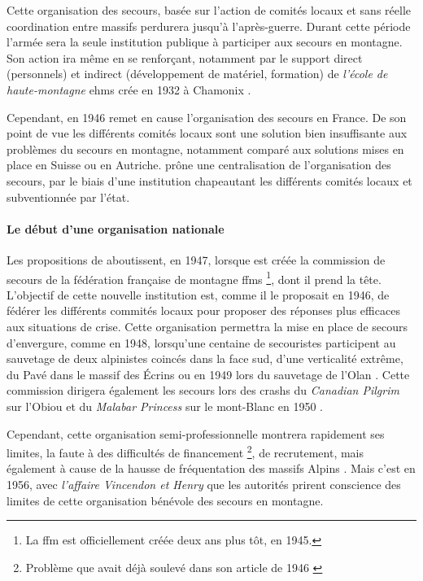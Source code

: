 Cette organisation des secours, basée sur l'action de comités locaux
et sans réelle coordination entre massifs perdurera jusqu'à
l'après-guerre. Durant cette période l'armée sera la seule institution
publique à participer aux secours en montagne. Son action ira même en
se renforçant, notamment par le support direct (personnels) et
indirect (développement de matériel, formation) de \emph{l'école de
  haute-montagne} \acp{ehm} crée en 1932 à Chamonix
\autocite{Mezin2016}.

Cependant, en 1946 \textcite{Devies1946} remet en cause l'organisation
des secours en France. De son point de vue les différents comités
locaux sont une solution bien insuffisante aux problèmes du secours
en montagne, notamment comparé aux solutions mises en place en Suisse
ou en Autriche.  prône une centralisation de
l'organisation des secours, par le biais d'une institution chapeautant
les différents comités locaux et subventionnée par l'état.

\paragraph{Le début d'une organisation nationale}

Les propositions de  aboutissent, en 1947, lorsque est
créée la commission de secours de la fédération française de montagne
\acp{ffm} \footnote{La \ac{ffm} est officiellement créée deux ans plus
  tôt, en 1945.}, dont il prend la tête. L'objectif de cette nouvelle
institution est, comme il le proposait en 1946, de fédérer les
différents commités locaux pour proposer des réponses plus efficaces
aux situations de crise. Cette organisation permettra la mise en place
de secours d'envergure, comme en 1948, lorsqu'une centaine de
secouristes participent au sauvetage de deux alpinistes coincés dans
la face sud, d'une verticalité extrême, du Pavé dans le massif des
Écrins \autocite{Romanaz2018} ou en 1949 lors du sauvetage de l'Olan
\autocite{Mollaret1993}. Cette commission dirigera également les
secours lors des crashs du \emph{Canadian Pilgrim} sur l'Obiou et du
\emph{Malabar Princess} sur le mont-Blanc en 1950
\autocite{CFDLD,Mollaret1993,SDSM2013}.

Cependant, cette organisation semi-professionnelle montrera rapidement
ses limites, la faute à des difficultés de financement
\footnote{Problème que  avait déjà soulevé dans son
  article de 1946 \autocite{Devies1946}}, de recrutement, mais
également à cause de la hausse de fréquentation des massifs Alpins
\autocite{CFDLD}. Mais c'est en 1956, avec \emph{l'affaire Vincendon
  et Henry} que les autorités prirent conscience des limites de cette
organisation bénévole des secours en montagne.

